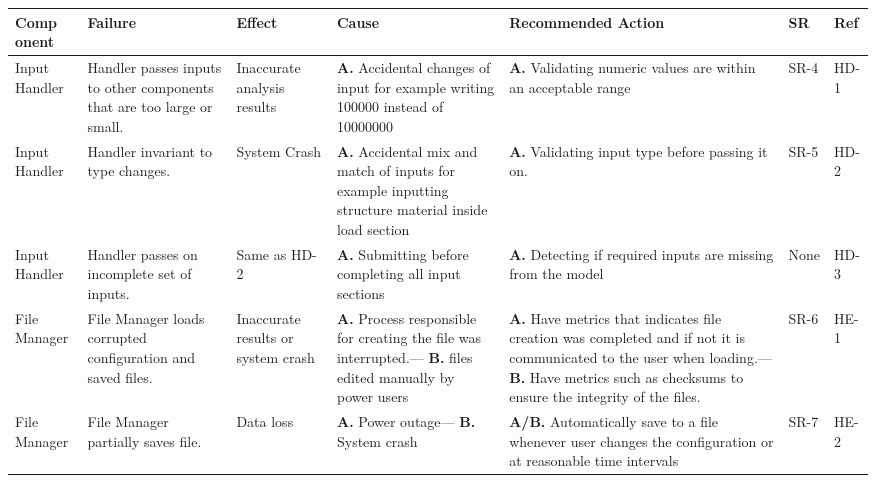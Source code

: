 \documentclass{article}
\begin{document}
        \begin{table}[H]
            \begin{tabular}{|p{} | p{} | p{} | p{} | p{} | p{} | p{}|}
            \toprule
            \textbf{Comp onent} & \textbf{Failure} & \textbf{Effect} & \textbf{Cause} & \textbf{Recommended Action} & \textbf{SR} & \textbf{Ref}\\
        \midrule
        Input Handler& Handler passes inputs to other components that are too large or small.
        & Inaccurate analysis results
        & \textbf{A.} Accidental changes of input for example writing 100000 instead of 10000000      
        & \textbf{A.} Validating numeric values are within an acceptable range   
        &SR-4&HD-1\\
        \midrule
        Input Handler& Handler invariant to type changes.
        & System Crash
        & \textbf{A.} Accidental mix and match of inputs for example inputting structure material inside load section
        & \textbf{A.} Validating input type before passing it on.    
        &SR-5&HD-2\\
        \midrule
        Input Handler& Handler passes on incomplete set of inputs.
        & Same as HD-2
        & \textbf{A.} Submitting before completing all input sections     
        & \textbf{A.} Detecting if required inputs are missing from the model   
        &None&HD-3\\
        \midrule
        File Manager& File Manager loads corrupted configuration and saved files.
        & Inaccurate results or system crash
        & \textbf{A.} Process responsible for creating the file was interrupted.---
          \textbf{B.} files edited manually by power users
        & \textbf{A.} Have metrics that indicates file creation was completed and if not it is communicated to the user when loading.---
          \textbf{B.} Have metrics such as checksums to ensure the integrity of the files.  
        &SR-6&HE-1\\
        \midrule
        File Manager& File Manager partially saves file.
        & Data loss
        & \textbf{A.} Power outage---
          \textbf{B.} System crash        
        & \textbf{A/B.} Automatically save to a file whenever user changes the configuration or at reasonable time intervals  
        &SR-7&HE-2\\
        \bottomrule
          \end{tabular}
          \end{table}
\end{document}
